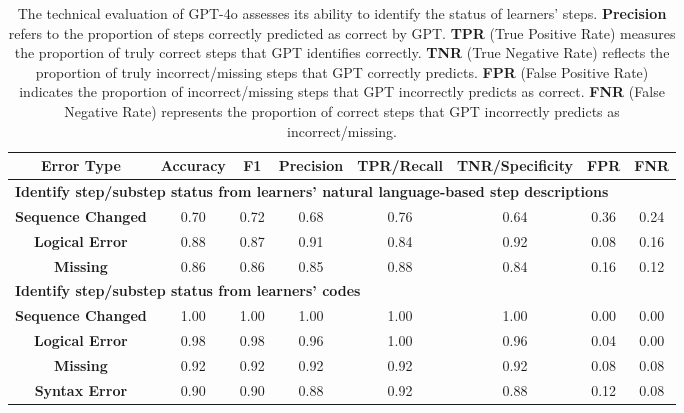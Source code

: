 \begin{table*}[hbpt]
	\centering
	\caption{The technical evaluation of GPT-4o assesses its ability to identify the status of learners' steps. \textbf{Precision} refers to the proportion of steps correctly predicted as correct by GPT. \textbf{TPR} (True Positive Rate) measures the proportion of truly correct steps that GPT identifies correctly. \textbf{TNR} (True Negative Rate) reflects the proportion of truly incorrect/missing steps that GPT correctly predicts. \textbf{FPR} (False Positive Rate) indicates the proportion of incorrect/missing steps that GPT incorrectly predicts as correct. \textbf{FNR} (False Negative Rate) represents the proportion of correct steps that GPT incorrectly predicts as incorrect/missing.}
	\label{tab:technicalresult}%
	\begin{small}
	\begin{tabular}{c | c c c c c c c}
	    \hline
	    \textbf{Error Type}&Accuracy&F1&Precision&TPR/Recall&TNR/Specificity&FPR&FNR\\
	    \hline
 \hline
\multicolumn{8}{l}{\textbf{Identify step/substep status from learners' natural language-based step descriptions}}\\
\hline    
	    \textbf{Sequence Changed}&0.70&0.72&0.68&0.76&0.64&0.36&0.24\\
	
 \rowcolor{gray!15}\textbf{Logical Error}&0.88&0.87&0.91&0.84&0.92&0.08&0.16\\
	    \textbf{Missing}&0.86&0.86&0.85&0.88&0.84&0.16&0.12 \\

 \hline
\multicolumn{8}{l}{\textbf{Identify step/substep status from learners' codes}}\\
\hline
    \rowcolor{gray!15}\textbf{Sequence Changed}&1.00&1.00&1.00&1.00&1.00&0.00&0.00\\

	\textbf{Logical Error}&0.98&0.98&0.96&1.00&0.96&0.04&0.00\\

 
    \rowcolor{gray!15}\textbf{Missing}&0.92&0.92&0.92&0.92&0.92&0.08&0.08\\


    \textbf{Syntax Error}&0.90&0.90&0.88&0.92&0.88&0.12&0.08\\
	    \hline
	\end{tabular}%
	\end{small}
\end{table*}

